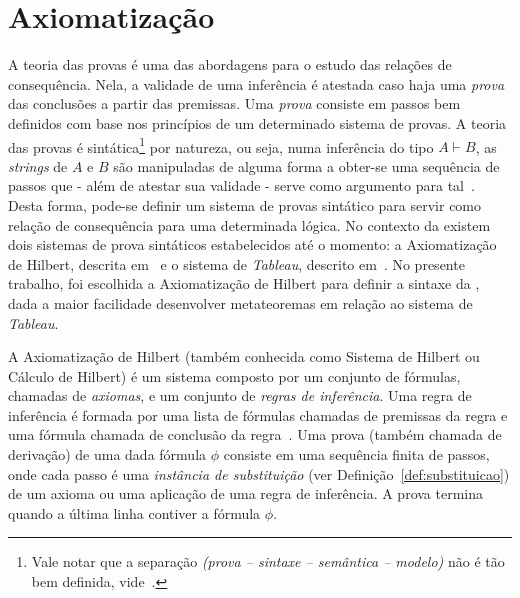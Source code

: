 \section{Axiomatização}
\label{sec:axiomatizacao}
A teoria das provas é uma das abordagens para o estudo das relações de consequência. Nela, a validade de uma inferência é atestada caso haja uma \textit{prova} das conclusões a partir das premissas. Uma \textit{prova} consiste em passos bem definidos com base nos princípios de um determinado sistema de provas. A teoria das provas é sintática\footnote{Vale notar que a separação \textit{(prova {--} sintaxe {--} semântica {--} modelo)} não é tão bem definida, vide~.} por natureza, ou seja, numa inferência do tipo $A \vdash B$, as \textit{strings} de $A$ e $B$ são manipuladas de alguma forma a obter-se uma sequência de passos que {-} além de atestar sua validade {-} serve como argumento para tal~\cite{sep-logical-consequence}. Desta forma, pode-se definir um sistema de provas sintático para servir como relação de consequência para uma determinada lógica. No contexto da \lfium{} existem dois sistemas de prova sintáticos estabelecidos até o momento: a Axiomatização de Hilbert, descrita em~\cite{carnielli2000formal, Carnielli_Coniglio_2016} e o sistema de \textit{Tableau}, descrito em~\cite{tableaulfi}. No presente trabalho, foi escolhida a Axiomatização de Hilbert para definir a sintaxe da \lfium{}, dada a maior facilidade desenvolver metateoremas em relação ao sistema de \textit{Tableau}.

A Axiomatização de Hilbert (também conhecida como Sistema de Hilbert ou Cálculo de Hilbert) é um sistema composto por um conjunto de fórmulas, chamadas de \textit{axiomas}, e um conjunto de \textit{regras de inferência}. Uma regra de inferência é formada por uma lista de fórmulas chamadas de premissas da regra e uma fórmula chamada de conclusão da regra~\cite{Restall1999-RESAIT-4}. Uma prova (também chamada de derivação) de uma dada fórmula $\phi$ consiste em uma sequência finita de passos, onde cada passo é uma \textit{instância de substituição} (ver Definição~\ref{def:substituicao}) de um axioma ou uma aplicação de uma regra de inferência. A prova termina quando a última linha contiver a fórmula $\phi$. 


